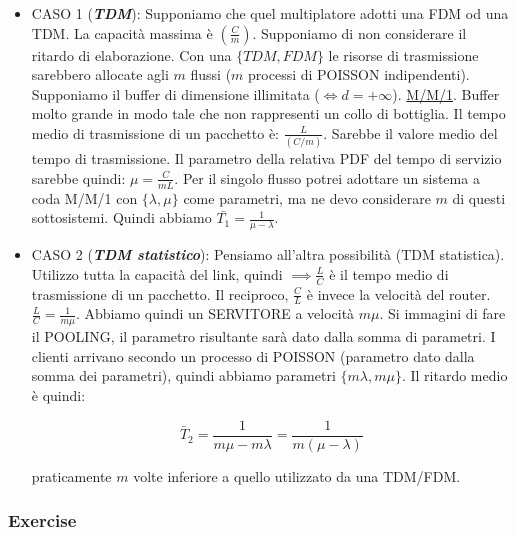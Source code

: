 \begin{itemize}

\item{CASO 1 (\textbf{\textit{TDM}})}: Supponiamo che quel multiplatore adotti una FDM od una TDM. La capacità massima è $(\frac{C}{m})$. Supponiamo di non considerare il ritardo di elaborazione. Con una $\{TDM,FDM\}$ le risorse di trasmissione sarebbero allocate agli $m$ flussi ($m$ processi di POISSON indipendenti). Supponiamo il buffer di dimensione illimitata ($\iff d=+\infty$). \underline{M/M/1}. Buffer molto grande in modo tale che non rappresenti un collo di bottiglia. Il tempo medio di trasmissione di un pacchetto è: $\frac{\mathit{L}}{(C/m)}$. Sarebbe il valore medio del tempo di trasmissione. Il parametro della relativa PDF del tempo di servizio sarebbe quindi: $\mu = \frac{C}{m\mathit{L}}$. Per il singolo flusso potrei adottare un sistema a coda M/M/1 con $\{\lambda,\mu\}$ come parametri, ma ne devo considerare $m$ di questi sottosistemi. Quindi abbiamo $\bar{T_1} = \frac{1}{\mu-\lambda}$.
\item{CASO 2 (\textbf{\textit{TDM statistico}})}: Pensiamo all'altra possibilità (TDM statistica). Utilizzo tutta la capacità del link, quindi $\implies \frac{\mathit{L}}{C}$ è il tempo medio di trasmissione di un pacchetto. Il reciproco, $\frac{C}{\mathit{L}}$ è invece la velocità del router. $\frac{\mathit{L}}{C} = \frac{1}{m\mu}$. Abbiamo quindi un SERVITORE a velocità $m\mu$. Si immagini di fare il POOLING, il parametro risultante sarà dato dalla somma di parametri. I clienti arrivano secondo un processo di POISSON (parametro dato dalla somma dei parametri), quindi abbiamo parametri $\{m\lambda,m\mu\}$. Il ritardo medio è quindi:

\[
	\bar{T}_2 = \frac{1}{m\mu-m\lambda} = \frac{1}{m(\mu-\lambda)}
\]

praticamente $m$ volte inferiore a quello utilizzato da una TDM/FDM.

\end{itemize}

\subsubsection{Exercise}

